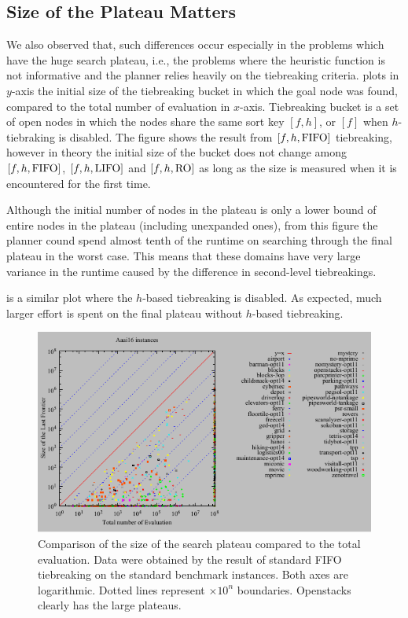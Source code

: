 \subsection{Size of the Plateau Matters}

We also observed that, such differences occur especially in the problems which
have the huge search plateau, i.e., the problems where the heuristic
function is not informative and the planner relies heavily on the
tiebreaking criteria.
% 
 plots in $y$-axis the initial size of the tiebreaking bucket in
which the goal node was found, compared to the total number of
evaluation in $x$-axis. Tiebreaking bucket is a set of open nodes in which the
nodes share the same sort key $[f,h]$, or $[f]$ when $h$-tiebraking is
disabled. 
The figure shows the result from $[f,h,\mbox{FIFO}]$ tiebreaking, however in
theory the initial size of the bucket does not change among
$[f,h,\mbox{FIFO}]$, $[f,h,\mbox{LIFO}]$ and $[f,h,\mbox{RO}]$ as long as the size
is measured when it is encountered for the first time.

Although the initial number of nodes in the plateau is only a lower
bound of entire nodes in the plateau (including unexpanded ones), from
this figure the planner cound spend almost tenth of the runtime on
searching through the final plateau in the worst case. This means that
these domains have very large variance in the runtime caused by the
difference in second-level tiebreakings.

% 
 is a similar plot where the $h$-based tiebreaking is
disabled. As expected, much larger effort is spent on the final plateau
without $h$-based tiebreaking.

\begin{figure}[htb]
 \centering {}
 \includegraphics{tables/aaai16-front-vs-evaluated.pdf}
 \caption{Comparison of the size of the search plateau compared to the
 total evaluation. Data were obtained by the result of standard FIFO
 tiebreaking on the standard benchmark instances. Both axes are
 logarithmic. Dotted lines represent $\times 10^n$ boundaries.
 Openstacks clearly has the large plateaus.}  \label{plateau-h}
\end{figure}

